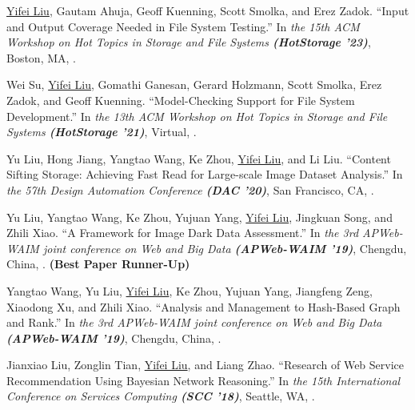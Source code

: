 \documentclass[letterpaper,10pt,oneside]{article}
\begin{document}
\begin{body}

\NumberedItem{[3]}
\underline{Yifei Liu}, Gautam Ahuja, Geoff Kuenning, Scott Smolka, and Erez Zadok.
``Input and Output Coverage Needed in File System Testing.''
In \textit{the 15th ACM Workshop on Hot Topics in Storage and File Systems \textbf{(HotStorage '23)}}, Boston, MA,
.


\NumberedItem{[4]}
Wei Su, \underline{Yifei Liu}, Gomathi Ganesan, Gerard Holzmann, Scott Smolka, Erez Zadok, and Geoff Kuenning.
``Model-Checking Support for File System Development.''
In \textit{the 13th ACM Workshop on Hot Topics in Storage and File Systems \textbf{(HotStorage '21)}}, Virtual,
.


\NumberedItem{[5]}
Yu Liu, Hong Jiang, Yangtao Wang, Ke Zhou, \underline{Yifei Liu}, and Li Liu.
``Content Sifting Storage: Achieving Fast Read for Large-scale Image Dataset Analysis.''
In \textit{the 57th Design Automation Conference \textbf{(DAC '20)}}, San Francisco, CA,
.


\NumberedItem{[6]}
Yu Liu, Yangtao Wang, Ke Zhou, Yujuan Yang, \underline{Yifei Liu}, Jingkuan Song, and Zhili Xiao.
``A Framework for Image Dark Data Assessment.''
In \textit{the 3rd APWeb-WAIM joint conference on Web and Big Data \textbf{(APWeb-WAIM '19)}}, Chengdu, China,
. \textbf{(Best Paper Runner-Up)}


\NumberedItem{[7]}
Yangtao Wang, Yu Liu, \underline{Yifei Liu}, Ke Zhou, Yujuan Yang, Jiangfeng Zeng, Xiaodong Xu, and Zhili Xiao.
``Analysis and Management to Hash-Based Graph and Rank.''
In \textit{the 3rd APWeb-WAIM joint conference on Web and Big Data \textbf{(APWeb-WAIM '19)}}, Chengdu, China,
. 


\NumberedItem{[8]}
Jianxiao Liu, Zonglin Tian, \underline{Yifei Liu}, and Liang Zhao.
``Research of Web Service Recommendation Using Bayesian Network Reasoning.''
In \textit{the 15th International Conference on Services Computing \textbf{(SCC '18)}}, Seattle, WA,
. 



\end{body}
\end{document}
